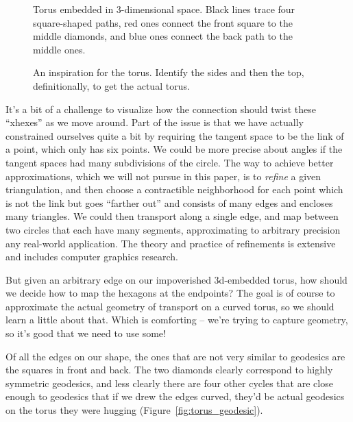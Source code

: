 \begin{figure}[h]
\centering

\caption{Torus embedded in 3-dimensional space. Black lines trace four square-shaped paths, red ones connect the front square to the middle diamonds, and blue ones connect the back path to the middle ones.}
\label{fig:torus}
\end{figure}

\begin{figure}[h]
\centering

\caption{An inspiration for the torus. Identify the sides and then the top, definitionally, to get the actual torus.}
\label{fig:flattorus}
\end{figure}

It's a bit of a challenge to visualize how the connection should twist these ``xhexes'' as we move around. Part of the issue is that we have actually constrained ourselves quite a bit by requiring the tangent space to be the link of a point, which only has six points. We could be more precise about angles if the tangent spaces had many subdivisions of the circle. The way to achieve better approximations, which we will not pursue in this paper, is to \emph{refine} a given triangulation, and then choose a contractible neighborhood for each point which is not the link but goes ``farther out'' and consists of many edges and encloses many triangles. We could then transport along a single edge, and map between two circles that each have many segments, approximating to arbitrary precision any real-world application. The theory and practice of refinements is extensive and includes computer graphics research.

But given an arbitrary edge on our impoverished 3d-embedded torus, how should we decide how to map the hexagons at the endpoints? The goal is of course to approximate the actual geometry of transport on a curved torus, so we should learn a little about that. Which is comforting -- we're trying to capture geometry, so it's good that we need to use some!

Of all the edges on our shape, the ones that are not very similar to geodesics are the squares in front and back. The two diamonds clearly correspond to highly symmetric geodesics, and less clearly there are four other cycles that are close enough to geodesics that if we drew the edges curved, they'd be actual geodesics on the torus they were hugging (Figure~\ref{fig:torus_geodesic}).


